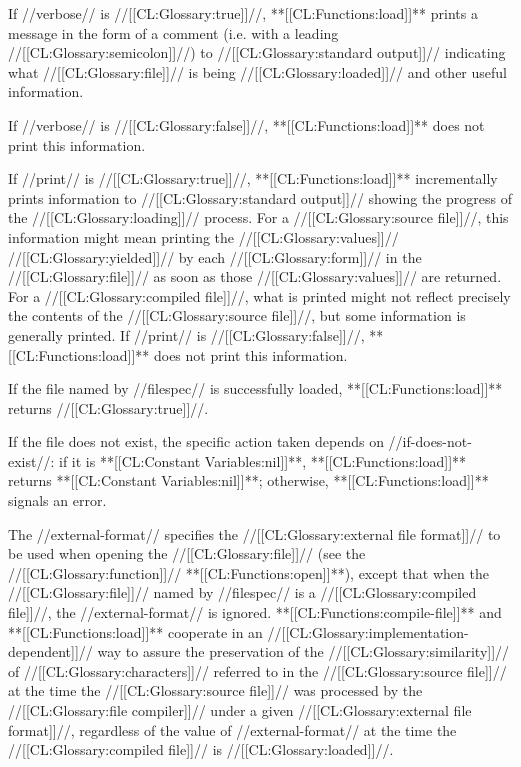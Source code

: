 If //verbose// is //[[CL:Glossary:true]]//, **[[CL:Functions:load]]** prints a message in the form of a comment (i.e. with a leading //[[CL:Glossary:semicolon]]//) to //[[CL:Glossary:standard output]]// indicating what //[[CL:Glossary:file]]// is being //[[CL:Glossary:loaded]]// and other useful information.

If //verbose// is //[[CL:Glossary:false]]//, **[[CL:Functions:load]]** does not print this information.

If //print// is //[[CL:Glossary:true]]//, **[[CL:Functions:load]]** incrementally prints information to //[[CL:Glossary:standard output]]// showing the progress of the //[[CL:Glossary:loading]]// process. For a //[[CL:Glossary:source file]]//, this information might mean printing the //[[CL:Glossary:values]]// //[[CL:Glossary:yielded]]// by each //[[CL:Glossary:form]]// in the //[[CL:Glossary:file]]// as soon as those //[[CL:Glossary:values]]// are returned. For a //[[CL:Glossary:compiled file]]//, what is printed might not reflect precisely the contents of the //[[CL:Glossary:source file]]//, but some information is generally printed. If //print// is //[[CL:Glossary:false]]//, **[[CL:Functions:load]]** does not print this information.

If the file named by //filespec// is successfully loaded, **[[CL:Functions:load]]** returns //[[CL:Glossary:true]]//.

 

If the file does not exist, the specific action taken depends on //if-does-not-exist//: if it is **[[CL:Constant Variables:nil]]**, **[[CL:Functions:load]]** returns **[[CL:Constant Variables:nil]]**; otherwise, **[[CL:Functions:load]]** signals an error.

The //external-format// specifies the //[[CL:Glossary:external file format]]// to be used when opening the //[[CL:Glossary:file]]// (see the //[[CL:Glossary:function]]// **[[CL:Functions:open]]**), except that when the //[[CL:Glossary:file]]// named by //filespec// is a //[[CL:Glossary:compiled file]]//, the //external-format// is ignored. **[[CL:Functions:compile-file]]** and **[[CL:Functions:load]]** cooperate in an //[[CL:Glossary:implementation-dependent]]// way to assure the preservation of the //[[CL:Glossary:similarity]]// of //[[CL:Glossary:characters]]// referred to in the //[[CL:Glossary:source file]]// at the time the //[[CL:Glossary:source file]]// was processed by the //[[CL:Glossary:file compiler]]// under a given //[[CL:Glossary:external file format]]//, regardless of the value of //external-format// at the time the //[[CL:Glossary:compiled file]]// is //[[CL:Glossary:loaded]]//.

